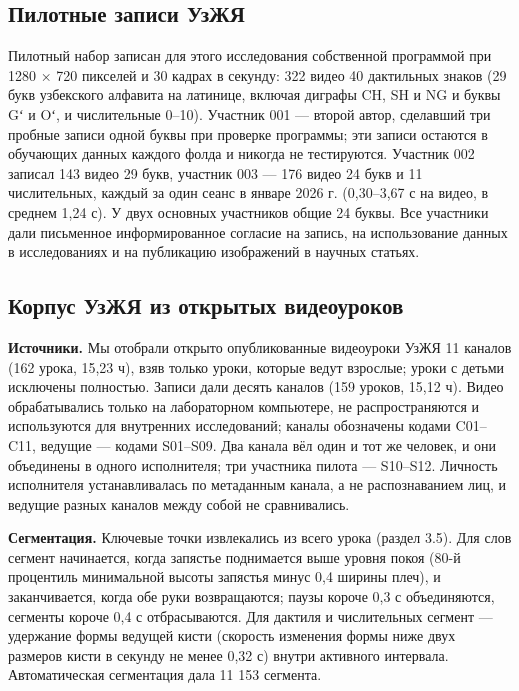 \hypertarget{ux43fux438ux43bux43eux442ux43dux44bux435-ux437ux430ux43fux438ux441ux438-ux443ux437ux436ux44f}{%
\subsection{Пилотные записи УзЖЯ}\label{ux43fux438ux43bux43eux442ux43dux44bux435-ux437ux430ux43fux438ux441ux438-ux443ux437ux436ux44f}}

Пилотный набор записан для этого исследования собственной программой при 1280 × 720 пикселей и 30 кадрах в секунду: 322 видео 40 дактильных знаков (29 букв узбекского алфавита на латинице, включая диграфы CH, SH и NG и буквы Gʻ и Oʻ, и числительные 0--10). Участник 001 --- второй автор, сделавший три пробные записи одной буквы при проверке программы; эти записи остаются в обучающих данных каждого фолда и никогда не тестируются. Участник 002 записал 143 видео 29 букв, участник 003 --- 176 видео 24 букв и 11 числительных, каждый за один сеанс в январе 2026 г. (0,30--3,67 с на видео, в среднем 1,24 с). У двух основных участников общие 24 буквы. Все участники дали письменное информированное согласие на запись, на использование данных в исследованиях и на публикацию изображений в научных статьях.

\hypertarget{ux43aux43eux440ux43fux443ux441-ux443ux437ux436ux44f-ux438ux437-ux43eux442ux43aux440ux44bux442ux44bux445-ux432ux438ux434ux435ux43eux443ux440ux43eux43aux43eux432}{%
\subsection{Корпус УзЖЯ из открытых видеоуроков}\label{ux43aux43eux440ux43fux443ux441-ux443ux437ux436ux44f-ux438ux437-ux43eux442ux43aux440ux44bux442ux44bux445-ux432ux438ux434ux435ux43eux443ux440ux43eux43aux43eux432}}

\textbf{Источники.} Мы отобрали открыто опубликованные видеоуроки УзЖЯ 11 каналов (162 урока, 15,23 ч), взяв только уроки, которые ведут взрослые; уроки с детьми исключены полностью. Записи дали десять каналов (159 уроков, 15,12 ч). Видео обрабатывались только на лабораторном компьютере, не распространяются и используются для внутренних исследований; каналы обозначены кодами C01--C11, ведущие --- кодами S01--S09. Два канала вёл один и тот же человек, и они объединены в одного исполнителя; три участника пилота --- S10--S12. Личность исполнителя устанавливалась по метаданным канала, а не распознаванием лиц, и ведущие разных каналов между собой не сравнивались.

\textbf{Сегментация.} Ключевые точки извлекались из всего урока (раздел 3.5). Для слов сегмент начинается, когда запястье поднимается выше уровня покоя (80-й процентиль минимальной высоты запястья минус 0,4 ширины плеч), и заканчивается, когда обе руки возвращаются; паузы короче 0,3 с объединяются, сегменты короче 0,4 с отбрасываются. Для дактиля и числительных сегмент --- удержание формы ведущей кисти (скорость изменения формы ниже двух размеров кисти в секунду не менее 0,32 с) внутри активного интервала. Автоматическая сегментация дала 11 153 сегмента.


